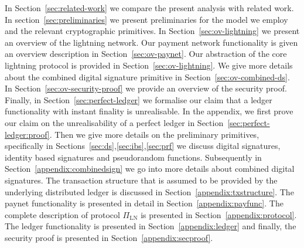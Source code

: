  In Section~\ref{sec:related-work} we compare the
present analysis with related work.  In
section~\ref{sec:preliminaries} we present preliminaries for the model we employ
and the relevant cryptographic primitives. In Section~\ref{sec:ov-lightning} we
present an overview of the lightning network. Our payment network functionality
is given an overview description in Section~\ref{sec:ov-paynet}. Our abstraction
of the core lightning protocol is provided in Section~\ref{sec:ov-lightning}. We
give more details about the combined digital signature primitive in
Section~\ref{sec:ov-combined-ds}. In Section~\ref{sec:ov-security-proof} we
provide an overview of the security proof.  Finally, in
Section~\ref{sec:perfect-ledger} we formalise our claim that a ledger
functionality with instant finality is unrealisable. In the appendix, we first
prove our claim on the unrealisability of a perfect ledger in
Section~\ref{sec:perfect-ledger:proof}.  Then we give more
details on the preliminary primitives, specifically in
Sections~\ref{sec:ds},\ref{sec:ibs},\ref{sec:prf} we discuss digital signatures,
identity based signatures and pseudorandom functions. Subsequently in
Section~\ref{appendix:combinedsign} we go into more details about combined
digital signatures. The transaction structure that is assumed to be provided by
the underlying distributed ledger is discussed in
Section~\ref{appendix:txstructure}. The paynet functionality is presented in
detail in Section~\ref{appendix:payfunc}. The complete description of protocol
$\Pi_{\mathrm{LN}}$ is presented in Section~\ref{appendix:protocol}. The ledger
functionality is presented in Section~\ref{appendix:ledger} and finally, the
security proof is presented in Section~\ref{appendix:secproof}.
